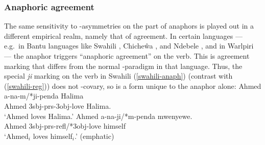 \documentclass[output=paper, modfonts, nonflat]{langsci/langscibook}
\begin{document}
\subsubsection{Anaphoric agreement}

The same sensitivity to \person-asymmetries on the part of anaphors is
played out in a different empirical realm, namely that of
agreement. In certain languages --- e.g.\ in Bantu languages like
Swahili \citep{woolford:1999}, Chiche\^wa \citep{baker:2008}, and
Ndebele \citep{bowlot:2002}, and in Warlpiri \citep{legate:2002} ---
the anaphor triggers ``anaphoric agreement'' on the verb.  This is
agreement marking that differs from the normal \ph-paradigm in that
language. Thus, the special \textit{ji} marking on the verb in Swahili
(\ref{swahili-anaph}) (contrast with (\ref{swahili-reg})) does not
\ph-covary, so is a form unique to the anaphor alone:
\ea\label{swahili-reg}\gll Ahmed a-na-m/*ji-penda
Halima\\
Ahmed {\sc 3sbj-prs-3obj}-love Halima.\\
\glt `Ahmed loves Halima.'  \ex\label{swahili-anaph}\gll Ahmed
a-na-ji/*m-penda
mwenyewe.\\
Ahmed {\sc 3sbj-prs-refl/*3obj}-love himself\\
\glt `Ahmed$_i$ loves himself$_i$.' (emphatic) \z
\end{document}
